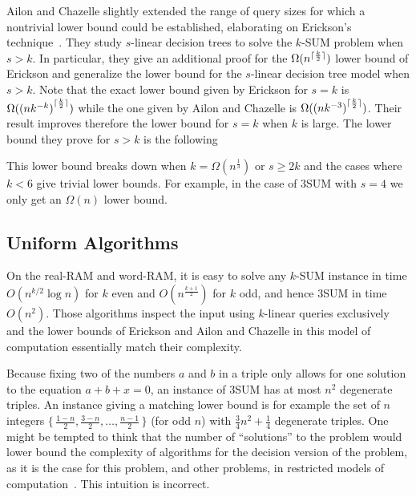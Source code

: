 

Ailon and Chazelle slightly extended the range of query sizes for which a
nontrivial lower bound could be established, elaborating on Erickson's
technique~\cite{AC05}.
%
They study \(s\)-linear decision trees to solve the \(k\)-SUM problem when
\(s > k\). In particular, they give an additional proof for the
$\Omega(n^{\lceil\frac{k}{2}\rceil})$ lower bound of Erickson and
generalize the lower bound for the \(s\)-linear decision tree model when \(s >
k\). Note that the exact lower bound given by Erickson for \(s = k\) is
$\Omega({(nk^{-k})}^{\lceil\frac{k}{2}\rceil})$ while the one given by
Ailon and Chazelle is $\Omega({(nk^{-3})}^{\lceil\frac{k}{2}\rceil})$. Their result
improves therefore the lower bound for \(s = k\) when \(k\) is large.
The lower bound they prove for \(s > k\) is the following
%

%
This lower bound breaks down when
\(k = \Omega(n^{\frac{1}{3}})\) or \(s \ge 2 k\) and the cases where \(k < 6\)
give trivial lower bounds. For example, in the case
of 3SUM with \(s = 4\) we only get an $\Omega(n)$ lower bound.

\subsection{Uniform Algorithms}

On the real-RAM and word-RAM,
it is easy to solve any \(k\)-SUM instance in time \(O(n^{k/2} \log n)\) for
\(k\) even and \(O(n^{\frac{k+1}{2}})\) for \(k\) odd,
and hence 3SUM in time \(O(n^2)\). Those algorithms inspect the input using
\(k\)-linear queries exclusively and the lower bounds of Erickson and Ailon and
Chazelle in this model of computation essentially match their complexity.

Because fixing two of the numbers $a$ and $b$ in a triple only allows for one
solution to the equation $a + b + x = 0$, an instance of 3SUM has at most
$n^2$ degenerate triples. An instance giving a matching lower bound is for
example the set
of \(n\) integers
$\{\,\frac{1-n}{2},\frac{3-n}{2},\ldots,\frac{n-1}{2}\,\}$ (for odd $n$)
with $\frac{3}{4} n^2 + \frac 14$ degenerate triples.
%
One might be tempted to think that the number of ``solutions'' to the problem
would lower bound the complexity of algorithms for the decision version of the
problem, as it is the case for this problem, and other problems, in restricted
models of computation~\cite{Er96,Er99a}.
%
This intuition is incorrect.
%

